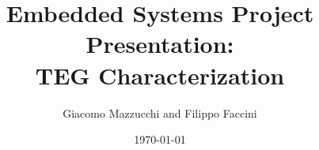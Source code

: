 \documentclass{beamer}
\begin{document}
 \title[BTech Project]{\vspace{0.15cm}Embedded Systems Project Presentation:\\TEG Characterization}  %
  \author[Giacomo Mazzucchi and Filippo Faccini]{ Giacomo Mazzucchi and Filippo Faccini
\scriptsize
 }
\scriptsize{\date{\today}} %








% 
% 
% 
% 
% 
% 
% 
% 
% 
\end{document}
